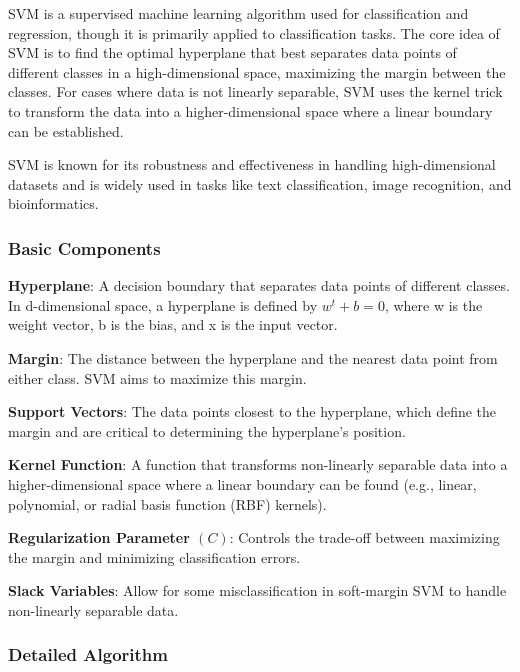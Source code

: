 SVM is a supervised machine learning algorithm used for classification and regression, though it is primarily applied to classification tasks.
The core idea of SVM is to find the optimal hyperplane that best separates data points of different classes in a high-dimensional space, maximizing the margin between the classes.
For cases where data is not linearly separable, SVM uses the kernel trick to transform the data into a higher-dimensional space where a linear boundary can be established.

SVM is known for its robustness and effectiveness in handling high-dimensional datasets and is widely used in tasks like text classification, image recognition, and bioinformatics.

\subsubsection{Basic Components}\textbf{}

\smallskip
\textbf{Hyperplane}: A decision boundary that separates data points of different classes.
In d-dimensional space, a hyperplane is defined by $w^t +b = 0$, where w is the weight vector, b is the bias, and x is the input vector.

\textbf{Margin}: The distance between the hyperplane and the nearest data point from either class.
SVM aims to maximize this margin.

\textbf{Support Vectors}: The data points closest to the hyperplane, which define the margin and are critical to determining the hyperplane’s position.

\textbf{Kernel Function}: A function that transforms non-linearly separable data into a higher-dimensional space where a linear boundary can be found (e.g., linear, polynomial, or radial basis function (RBF) kernels).

\textbf{Regularization Parameter $(C)$}: Controls the trade-off between maximizing the margin and minimizing classification errors.

\textbf{Slack Variables}: Allow for some misclassification in soft-margin SVM to handle non-linearly separable data.

\smallskip
\subsubsection{Detailed Algorithm}\textbf{}

